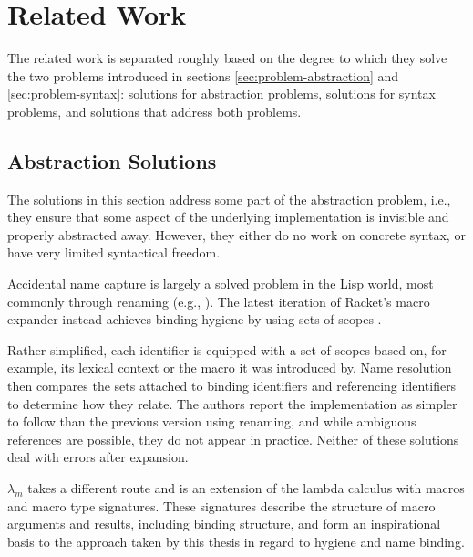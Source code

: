 \documentclass{kththesis}
\begin{document}
\chapter{Related Work}

The related work is separated roughly based on the degree to which they solve the two problems introduced in sections \ref{sec:problem-abstraction} and \ref{sec:problem-syntax}: solutions for abstraction problems, solutions for syntax problems, and solutions that address both problems.

\section{Abstraction Solutions} \label{sec:abstraction-solutions}

The solutions in this section address some part of the abstraction problem, i.e., they ensure that some aspect of the underlying implementation is invisible and properly abstracted away. However, they either do no work on concrete syntax, or have very limited syntactical freedom.

Accidental name capture is largely a solved problem in the Lisp world, most commonly through renaming (e.g., \cite{FLATT2012Macros-that-Wor}). The latest iteration of Racket's \cite{Flatt2010Reference:-Rack} macro expander instead achieves binding hygiene by using sets of scopes \cite{Flatt2016Binding-As-Sets}.

Rather simplified, each identifier is equipped with a set of scopes based on, for example, its lexical context or the macro it was introduced by. Name resolution then compares the sets attached to binding identifiers and referencing identifiers to determine how they relate. The authors report the implementation as simpler to follow than the previous version using renaming, and while ambiguous references are possible, they do not appear in practice. Neither of these solutions deal with errors after expansion.

$\lambda_m$ \cite{Herman2010A-Theory-of-Typ} takes a different route and is an extension of the lambda calculus with macros and macro type signatures. These signatures describe the structure of macro arguments and results, including binding structure, and form an inspirational basis to the approach taken by this thesis in regard to hygiene and name binding.
\end{document}
